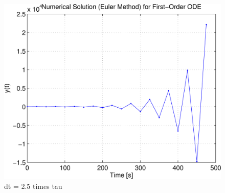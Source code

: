 \begin{figure}[hbt]
\centering
\includegraphics[width=\FigWidth\textwidth]{../code/firstorder_euler_soln2.png}
\caption{dt = 2.5 times tau}
\label{f:euler_soln2}
\end{figure}

\begin{soln}
\end{soln}
\fi


